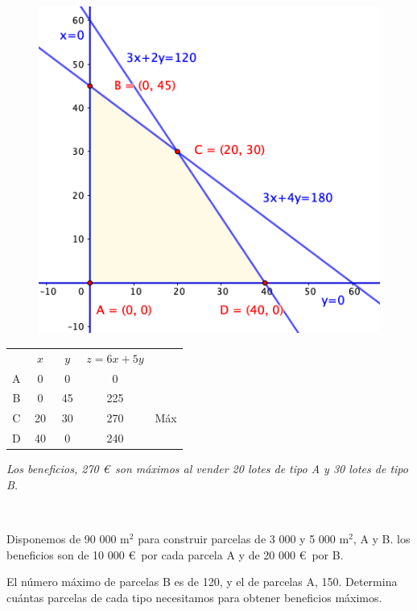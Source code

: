 \vspace{5mm}
\begin{multicols}{2}
	\begin{figure}[H]
	\centering
	\includegraphics[width=.5\textwidth]{imagenes/img39.png}
\end{figure}

\begin{table}[H]
\centering
\begin{tabular}{cc|c|cc}
 & $\ \ x \ \ $ & $\ \ y \ \ $ & $z=6x+5y$ &  \\ \cline{2-4}
\multicolumn{1}{c|}{A} & 0 & 0 & \multicolumn{1}{c|}{0} &  \\ \cline{1-4}
\multicolumn{1}{c|}{B} & 0 & 45 & \multicolumn{1}{c|}{225} &  \\ \hline
\multicolumn{1}{c|}{C} & 20 & 30 & \multicolumn{1}{c|}{270} & Máx \\ \hline
\multicolumn{1}{c|}{D} & 40 & 0 & \multicolumn{1}{c|}{240} &  \\ \cline{2-4}
\end{tabular}
\end{table}
\vspace{3mm}
\begin{adjustwidth}{10pt}{5pt}
\emph{Los beneficios, 270 \euro$\,$ son máximos al vender 20 lotes de tipo A y 30 lotes de tipo B.}
\end{adjustwidth}

$\,$
\end{multicols}




\vspace{10mm}
\begin{ejemplo}
\begin{ejer}
	Disponemos de 90 000 m$^2$ para construir parcelas de 3 000 y 5 000 m$^2$, A y B. los beneficios son de 10 000 \euro$\,$ por cada parcela A y de 20 000 \euro$\,$ por B.
	
El número máximo de parcelas B es de 120, y el de parcelas A, 150. Determina cuántas parcelas de cada tipo necesitamos para obtener beneficios máximos.
\end{ejer}	
\end{ejemplo}
\vspace{5mm}

